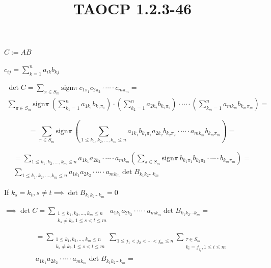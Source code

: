 \documentclass{article}
\title{TAOCP 1.2.3\mbox{-}46}
\begin{document}
\maketitle

\( C := AB \)

\( c_{ij} = \sum_{k=1}^{n} a_{ik}b_{kj} \)

\begin{multline*}
\det C = \sum_{\pi\in S_{m}} \mathrm{sign} \pi\  c_{1\pi_{1}}c_{2\pi_{2}} \cdot \cdots \cdot c_{m\pi_{m}} = \\
\sum_{\pi\in S_{m}} \mathrm{sign} \pi\ (\sum_{k_{1}=1}^{n} a_{1k_{1}}b_{k_{1}\pi_{1}})\cdot (\sum_{k_{2}=1}^{n} a_{2k_{2}}b_{k_{2}\pi_{2}}) \cdot \cdots \cdot (\sum_{k_{m}=1}^{n} a_{mk_{m}}b_{k_{m}\pi_{m}}) =
\end{multline*}

\[ = \sum_{\pi\in S_{m}} \mathrm{sign} \pi\ (\sum_{1\leq k_{1}, k_{2}, \ldots, k_{m} \leq n} a_{1k_{1}}b_{k_{1}\pi_{1}}a_{2k_{2}}b_{k_{2}\pi_{2}} \cdot \cdots \cdot a_{mk_{m}}b_{k_{m}\pi_{m}}) = \]

\begin{multline*}
= \sum_{1\leq k_{1}, k_{2}, \ldots, k_{m} \leq n} a_{1k_{1}}a_{2k_{2}} \cdot \cdots \cdot a_{mk_{m}} (\sum_{\pi\in S_{m}} \mathrm{sign} \pi\ b_{k_{1}\pi_{1}}b_{k_{2}\pi_{2}} \cdot \cdots \cdot b_{k_{m}\pi_{m}}) = \\
\sum_{1\leq k_{1}, k_{2}, \ldots, k_{m} \leq n} a_{1k_{1}}a_{2k_{2}} \cdot \cdots \cdot a_{mk_{m}} \det B_{k_{1}k_{2}\cdots k_{m}}
\end{multline*}

If \( k_{s} = k_{t}, s \neq t \implies \det B_{k_{1}k_{2}\cdots k_{m}} = 0 \)

\( \implies \det C = \sum_{\substack{1\leq k_{1}, k_{2}, \ldots, k_{m} \leq n\\k_{s} \neq k_{t}, 1 \leq s < t \leq m}} a_{1k_{1}}a_{2k_{2}} \cdot \cdots \cdot a_{mk_{m}} \det B_{k_{1}k_{2}\cdots k_{m}} = \)

\begin{multline*}
= \sum_{\substack{1\leq k_{1}, k_{2}, \ldots, k_{m} \leq n\\k_{s} \neq k_{t}, 1 \leq s < t \leq m }} \sum_{1\leq j_{1} < j_{2} < \cdots < j_{m} \leq n} \sum_{\substack{\tau \in S_{m}\\ k_{i} = j_{\tau_{i}}, 1 \leq i \leq m }} \\
a_{1k_{1}}a_{2k_{2}} \cdot \cdots \cdot a_{mk_{m}} \det B_{k_{1}k_{2}\cdots k_{m}} =
\end{multline*}
\end{document}
